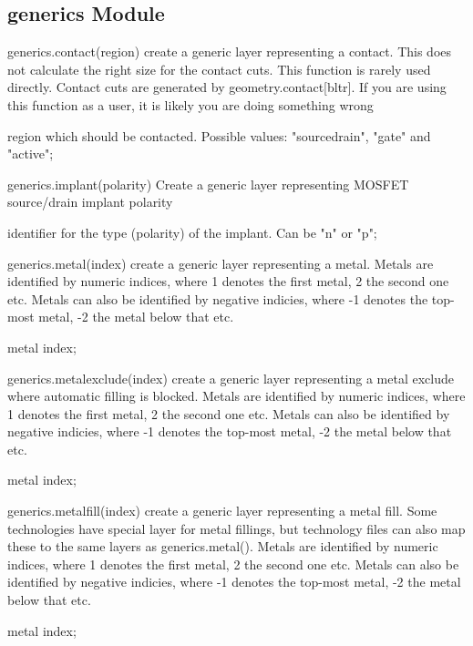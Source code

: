 \subsection{generics Module}
\begin{APIfunc}{generics.contact(region)}
    create a generic layer representing a contact. This does not calculate the right size for the contact cuts. This function is rarely used directly. Contact cuts are generated by geometry.contact[bltr]. If you are using this function as a user, it is likely you are doing something wrong
    \begin{APIparameters}
            region which should be contacted. Possible values: "sourcedrain", "gate" and "active";
    \end{APIparameters}
\end{APIfunc}
\begin{APIfunc}{generics.implant(polarity)}
    Create a generic layer representing MOSFET source/drain implant polarity
    \begin{APIparameters}
            identifier for the type (polarity) of the implant. Can be "n" or "p";
    \end{APIparameters}
\end{APIfunc}
\begin{APIfunc}{generics.metal(index)}
    create a generic layer representing a metal. Metals are identified by numeric indices, where 1 denotes the first metal, 2 the second one etc. Metals can also be identified by negative indicies, where -1 denotes the top-most metal, -2 the metal below that etc.
    \begin{APIparameters}
            metal index;
    \end{APIparameters}
\end{APIfunc}
\begin{APIfunc}{generics.metalexclude(index)}
    create a generic layer representing a metal exclude where automatic filling is blocked. Metals are identified by numeric indices, where 1 denotes the first metal, 2 the second one etc. Metals can also be identified by negative indicies, where -1 denotes the top-most metal, -2 the metal below that etc.
    \begin{APIparameters}
            metal index;
    \end{APIparameters}
\end{APIfunc}
\begin{APIfunc}{generics.metalfill(index)}
    create a generic layer representing a metal fill. Some technologies have special layer for metal fillings, but technology files can also map these to the same layers as generics.metal(). Metals are identified by numeric indices, where 1 denotes the first metal, 2 the second one etc. Metals can also be identified by negative indicies, where -1 denotes the top-most metal, -2 the metal below that etc.
    \begin{APIparameters}
            metal index;
    \end{APIparameters}
\end{APIfunc}

